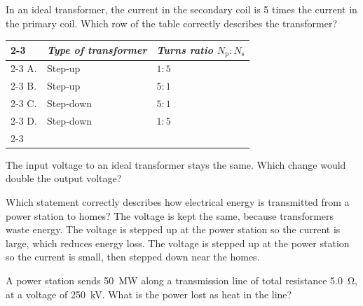 \begin{quizq}{}
In an ideal transformer, the current in the secondary coil is 5 times the current in the primary
coil. Which row of the table correctly describes the transformer?
\begin{center}
  \renewcommand\arraystretch{1.7}
  \begin{tabular}{@{}p{10mm}|>{\centering\arraybackslash}p{45mm}|>{\centering\arraybackslash}p{60mm}|}
    \cline{2-3}
    & \textit{Type of transformer} & \textit{Turns ratio $N_\mathrm{p} : N_\mathrm{s}$}\\ \cline{2-3}
    A. & Step-up & $1 : 5$\\ \cline{2-3}
    B. & Step-up & $5 : 1$\\ \cline{2-3}
    C. & Step-down & $5 : 1$\\ \cline{2-3}
    D. & Step-down & $1 : 5$\\ \cline{2-3}
  \end{tabular}
\end{center}
\end{quizq}

\begin{quizq}{}
The input voltage to an ideal transformer stays the same. Which change would double the output
voltage?
\end{quizq}

\begin{quizq}{}
Which statement correctly describes how electrical energy is transmitted from a power station to
homes?
  {The voltage is kept the same, because transformers waste energy.}
  {The voltage is stepped up at the power station so the current is large, which reduces energy loss.}
  {The voltage is stepped up at the power station so the current is small, then stepped down near the
   homes.}
\end{quizq}

\begin{quizq}{}
A power station sends \qty{50}{MW} along a transmission line of total resistance \qty{5.0}{\ohm}, at a
voltage of \qty{250}{kV}. What is the power lost as heat in the line?
\end{quizq}

